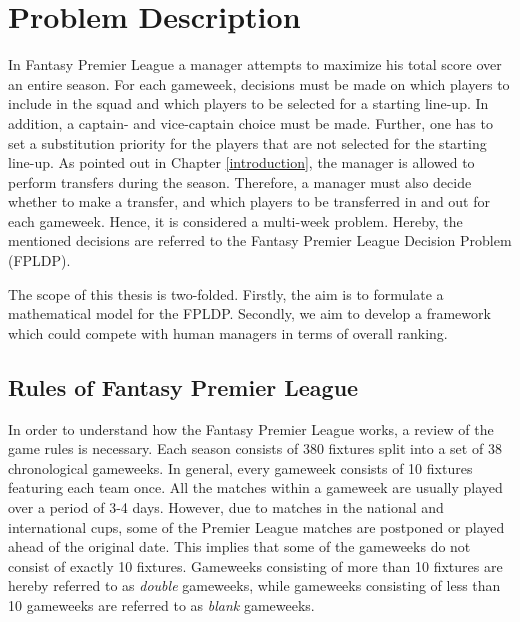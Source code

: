 
\chapter{Problem Description} \label{chapter_problem_description}
In Fantasy Premier League a manager attempts to maximize his total score over an entire season. For each gameweek, decisions must be made on which players to include in the squad and which players to be selected for a starting line-up. In addition, a captain- and vice-captain choice must be made. Further, one has to set a substitution priority for the players that are not selected for the starting line-up. As pointed out in Chapter \ref{introduction}, the manager is allowed to perform transfers during the season. Therefore, a manager must also decide whether to make a transfer, and which players to be transferred in and out for each gameweek. Hence, it is considered a multi-week problem. Hereby, the mentioned decisions are referred to the Fantasy Premier League Decision Problem (FPLDP).

\newpar

The scope of this thesis is two-folded. Firstly, the aim is to formulate a mathematical model for the FPLDP. Secondly, we aim to develop a framework which could compete with human managers in terms of overall ranking. 

\section{Rules of Fantasy Premier League} \label{rules of fpl}

In order to understand how the Fantasy Premier League works, a review of the game rules is necessary. Each season consists of 380 fixtures split into a set of 38 chronological gameweeks. In general, every gameweek consists of 10 fixtures featuring each team once. All the matches within a gameweek are usually played over a period of 3-4 days. However, due to matches in the national and international cups, some of the Premier League matches are postponed or played ahead of the original date. This implies that some of the gameweeks do not consist of exactly 10 fixtures. Gameweeks consisting of more than 10 fixtures are hereby referred to as \textit{double} gameweeks, while gameweeks consisting of less than 10 gameweeks are referred to as \textit{blank} gameweeks.


